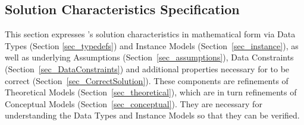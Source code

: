 \subsection{Solution Characteristics Specification}\label{Sec_scs}

This section expresses \progname{}'s solution characteristics in mathematical
form via Data Types (Section \ref{sec_typedefs}) and Instance Models
(Section~\ref{sec_instance}), as well as underlying Assumptions
(Section~\ref{sec_assumptions}), Data Constraints
(Section~\ref{sec_DataConstraints}) and additional properties necessary for
\progname{} to be correct (Section~\ref{sec_CorrectSolution}). These components
are refinements of Theoretical Models (Section~\ref{sec_theoretical}), which
are in turn refinements of Conceptual Models (Section~\ref{sec_conceptual}).
They are necessary for understanding the Data Types and Instance Models so that
they can be verified.



\afterpage{\clearpage}\newpage %



\newpage



\newpage



\newpage





\newpage



\newpage



\newpage



